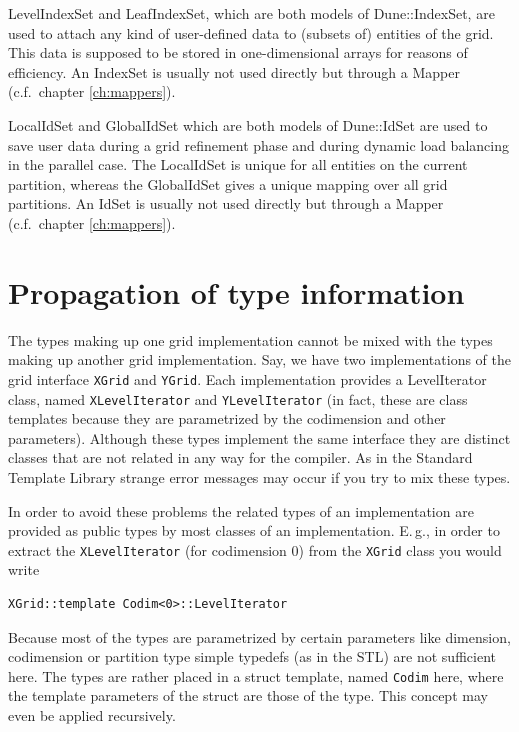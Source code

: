 \documentclass[11pt,a4paper,headinclude,footinclude,DIV16,normalheadings]{scrreprt}
\begin{document}

    LevelIndexSet and LeafIndexSet, which are both models of
    Dune::IndexSet, are used to attach any kind of user-defined data to
    (subsets of) entities of the grid. This data is supposed to be
    stored in one-dimensional arrays for reasons of efficiency. An IndexSet is
    usually not used directly but through a Mapper (c.f.~chapter
    \ref{ch:mappers}).


    LocalIdSet and GlobalIdSet which are both models of Dune::IdSet
    are used to save user data during a grid refinement phase and
    during dynamic load balancing in the parallel case. The LocalIdSet is
    unique for all entities on the current partition, whereas the GlobalIdSet
    gives a unique mapping over all grid partitions. An IdSet is usually not used
    directly but through a Mapper (c.f.~chapter
    \ref{ch:mappers}).


\section{Propagation of type information}

The types making up one grid implementation cannot be mixed with the
types making up another grid implementation. Say, we have two
implementations of the grid interface \lstinline!XGrid! and
\lstinline!YGrid!. Each implementation provides a LevelIterator
class, named \lstinline!XLevelIterator! and
\lstinline!YLevelIterator! (in fact, these are class templates because
they are parametrized by the codimension and other
parameters). Although these types implement the same interface they
are distinct classes that are not related in any way for the
compiler. As in the Standard Template Library strange error messages
may occur if you try to mix these types.

In order to avoid these problems the related types of an
implementation are provided as public types by most classes of an
implementation. E.\,g., in order to extract the
\lstinline!XLevelIterator! (for codimension 0) from the
\lstinline!XGrid! class you would write
\begin{lstlisting}
XGrid::template Codim<0>::LevelIterator
\end{lstlisting}
Because most of the types are parametrized by certain parameters like
dimension, codimension or partition type simple typedefs (as in the
STL) are not sufficient here. The types are rather placed in a
struct template, named \lstinline!Codim! here, where the template
parameters of the struct are those of the type. This concept may even
be applied recursively. 
\end{document}
